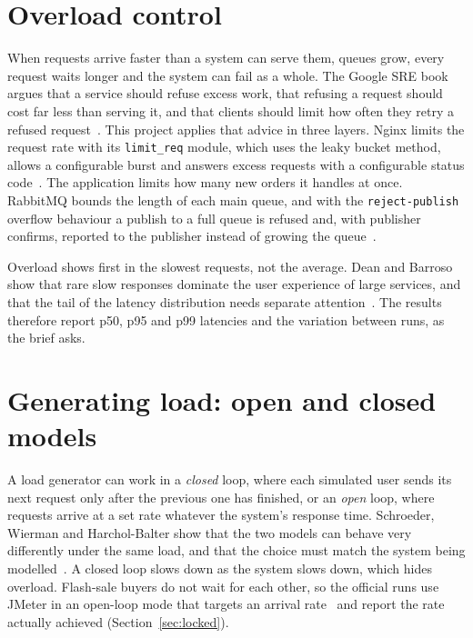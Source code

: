 \documentclass[a4paper]{report}
\begin{document}
\section{Overload control}
\label{sec:bg-overload}

When requests arrive faster than a system can serve them, queues grow, every
request waits longer and the system can fail as a whole. The Google SRE book
argues that a service should refuse excess work, that refusing a request
should cost far less than serving it, and that clients should limit how often
they retry a refused request~\cite{sre-overload}. This project
applies that advice in three layers. Nginx limits the request rate with its
\texttt{limit\_req} module, which uses the leaky bucket method, allows a
configurable burst and answers excess requests with a configurable status
code~\cite{nginx-limit-req}. The application limits how many new orders it
handles at once. RabbitMQ bounds the length of each main queue, and with the
\texttt{reject-publish} overflow behaviour a publish to a full queue is refused
and, with publisher confirms, reported to the publisher instead of growing the
queue~\cite{rmq-maxlength}.

Overload shows first in the slowest requests, not the average. Dean and Barroso
show that rare slow responses dominate the user experience of large services,
and that the tail of the latency distribution needs separate
attention~\cite{dean-tail}. The results therefore report p50, p95 and p99
latencies and the variation between runs, as the brief asks.

\section{Generating load: open and closed models}
\label{sec:bg-load}

A load generator can work in a \emph{closed} loop, where each simulated user
sends its next request only after the previous one has finished, or an
\emph{open} loop, where requests arrive at a set rate whatever the system's
response time. Schroeder, Wierman and Harchol-Balter show that the two models
can behave very differently under the same load, and that the choice must
match the system being modelled~\cite{schroeder-open-closed}. A closed loop
slows down as the system slows down, which hides overload. Flash-sale buyers do
not wait for each other, so the official runs use JMeter in an open-loop mode
that targets an arrival rate~\cite{jmeter-components} and report the rate
actually achieved (Section~\ref{sec:locked}).
\end{document}
